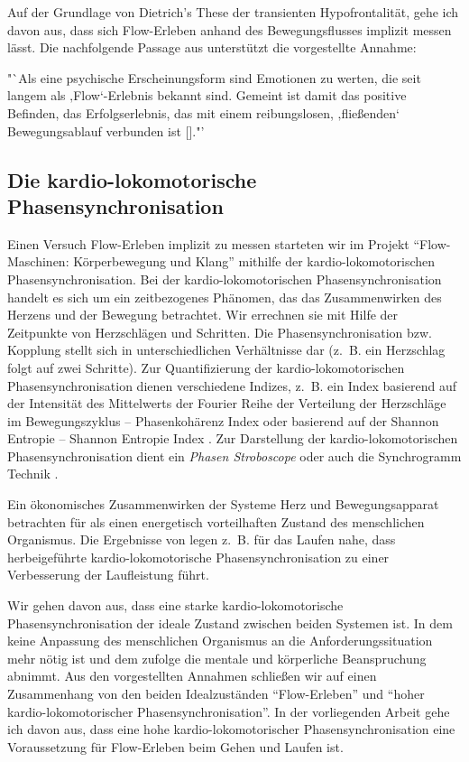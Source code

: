 Auf der Grundlage von Dietrich’s These der transienten Hypofrontalität, gehe ich davon aus, dass sich Flow-Erleben anhand des Bewegungsflusses implizit messen lässt. Die nachfolgende Passage aus \citet[][S.~121]{Meinel2007} unterstützt die vorgestellte Annahme:

"`Als eine psychische Erscheinungsform sind Emotionen zu werten, die seit langem als ‚Flow‘-Erlebnis bekannt sind. Gemeint ist damit das positive Befinden, das Erfolgserlebnis, das mit einem reibungslosen, ‚fließenden‘ Bewegungsablauf verbunden ist [\textellipsis]."'

\subsection{Die kardio-lokomotorische Phasensynchronisation}
\label{sub:die_kardio_lokomotorische_phasensynchronisation}

Einen Versuch Flow-Erleben implizit zu messen starteten wir im Projekt "`Flow-Maschinen: Körperbewegung und Klang"' mithilfe der kardio-lokomotorischen Phasensynchronisation. Bei der kardio-lokomotorischen Phasensynchronisation handelt es sich um ein zeitbezogenes Phänomen, das das Zusammenwirken des Herzens und der Bewegung betrachtet. Wir errechnen sie mit Hilfe der Zeitpunkte von Herzschlägen und Schritten. Die Phasensynchronisation bzw. Kopplung stellt sich in unterschiedlichen Verhältnisse dar (z.~B. ein Herzschlag folgt auf zwei Schritte). Zur Quantifizierung der kardio-lokomotorischen Phasensynchronisation dienen verschiedene Indizes, z.~B. ein Index basierend auf der Intensität des Mittelwerts der Fourier Reihe der Verteilung der Herzschläge im Bewegungszyklus -- Phasenkohärenz Index \citep{Rosenblum2003} oder basierend auf der Shannon Entropie -- Shannon Entropie Index \citep{Tass1998, Niizeki2005}. Zur Darstellung der kardio-lokomotorischen Phasensynchronisation dient ein \emph{Phasen Stroboscope} \citep[vgl.][]{Mrowka2000} oder auch die Synchrogramm Technik \citep[vgl.][]{Schafer1999}.

Ein ökonomisches Zusammenwirken der Systeme Herz und Bewegungsapparat betrachten für \citet[S.~18]{Niizeki2014} als einen energetisch vorteilhaften Zustand des menschlichen Organismus. Die Ergebnisse von \citet{Phillips2013} legen z.~B. für das Laufen nahe, dass herbeigeführte kardio-lokomotorische Phasensynchronisation zu einer Verbesserung der Laufleistung führt.

Wir gehen davon aus, dass eine starke kardio-lokomotorische Phasensynchronisation der ideale Zustand zwischen beiden Systemen ist. In dem keine Anpassung des menschlichen Organismus an die Anforderungssituation mehr nötig ist und dem zufolge die mentale und körperliche Beanspruchung abnimmt. Aus den vorgestellten Annahmen schließen wir auf einen Zusammenhang von den beiden Idealzuständen "`Flow-Erleben"' und "`hoher kardio-lokomotorischer Phasensynchronisation"'. In der vorliegenden Arbeit gehe ich davon aus, dass eine hohe kardio-lokomotorischer Phasensynchronisation eine Voraussetzung für Flow-Erleben beim Gehen und Laufen ist.

